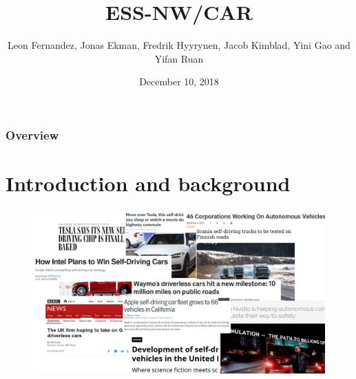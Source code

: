 \documentclass{beamer}
\title[ESS-NW/CAR]{ESS-NW/CAR } %
\author{ Leon Fernandez, Jonas Ekman, Fredrik Hyyrynen, Jacob Kimblad, Yini Gao and  Yifan Ruan} %
\institute[KTH] %
{
    MF2063 \\ %
    \medskip

}
\date{December 10, 2018} %
\begin{document}
\begin{frame}
    \titlepage %
\end{frame}

\begin{frame}
    \frametitle{Overview} %
    \tableofcontents %
\end{frame}


\section{Introduction and background} 
\begin{frame}
    \begin{figure}
        \includegraphics[width=1.2\linewidth]{articles.jpg}
    \end{figure}
\end{frame}

\end{document}
